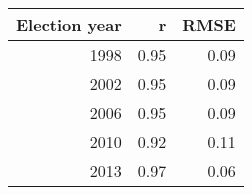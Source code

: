 
\begin{tabular}{r|r|r}
\hline
Election year & r & RMSE\\
\hline
1998 & 0.95 & 0.09\\
\hline
2002 & 0.95 & 0.09\\
\hline
2006 & 0.95 & 0.09\\
\hline
2010 & 0.92 & 0.11\\
\hline
2013 & 0.97 & 0.06\\
\hline
\end{tabular}
